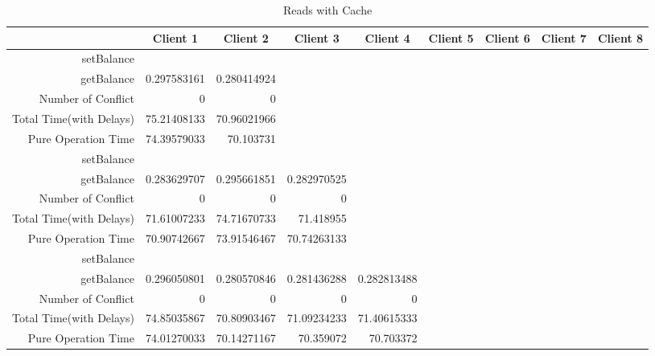 \begin{landscape}
\begin{table}[htbp]
\scriptsize
  \centering
  \caption{Reads with Cache}
    \begin{tabular}{rrrrrrrrr}
    \toprule
          & \multicolumn{1}{c}{Client 1} & \multicolumn{1}{c}{Client 2} & \multicolumn{1}{c}{Client 3} & \multicolumn{1}{c}{Client 4} & \multicolumn{1}{c}{Client 5} & \multicolumn{1}{c}{Client 6} & \multicolumn{1}{c}{Client 7} & \multicolumn{1}{c}{Client 8} \\
    \midrule
    setBalance &       &       &       &       &       &       &       &  \\
    getBalance & 0.297583161 & 0.280414924 &       &       &       &       &       &  \\
    Number of Conflict & 0     & 0     &       &       &       &       &       &  \\
    Total Time(with Delays) & 75.21408133 & 70.96021966 &       &       &       &       &       &  \\
    Pure Operation Time & 74.39579033 & 70.103731 &       &       &       &       &       &  \\
\cline{1-9}    
    setBalance &       &       &       &       &       &       &       &  \\
    getBalance & 0.283629707 & 0.295661851 & 0.282970525 &       &       &       &       &  \\
    Number of Conflict & 0     & 0     & 0     &       &       &       &       &  \\
    Total Time(with Delays) & 71.61007233 & 74.71670733 & 71.418955 &       &       &       &       &  \\
    Pure Operation Time & 70.90742667 & 73.91546467 & 70.74263133 &       &       &       &       &  \\
\cline{1-9}   
    setBalance &       &       &       &       &       &       &       &  \\
    getBalance & 0.296050801 & 0.280570846 & 0.281436288 & 0.282813488 &       &       &       &  \\
    Number of Conflict & 0     & 0     & 0     & 0     &       &       &       &  \\
    Total Time(with Delays) & 74.85035867 & 70.80903467 & 71.09234233 & 71.40615333 &       &       &       &  \\
    Pure Operation Time & 74.01270033 & 70.14271167 & 70.359072 & 70.703372 &       &       &       &  \\

\end{tabular}
\end{table}
\end{landscape}
